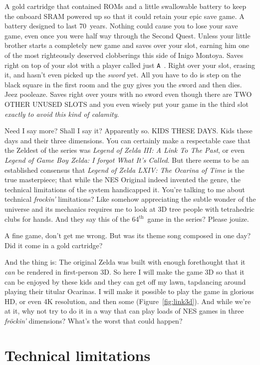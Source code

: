 \documentclass[twocolumn]{article}
\renewcommand\th{$^{\mathrm{th}}$}
\begin{document}
A gold cartridge that contained ROMs and a little swallowable battery
to keep the onboard SRAM powered up so that it could retain your epic
save game. A battery designed to last 70~years. Nothing could cause
you to lose your save game, even once you were half way through the
Second Quest. Unless your little brother starts a completely new game
and saves over your slot, earning him one of the most righteously
deserved clobberings this side of Inigo Montoya. Saves right on top of
your slot with a player called just \verb+A +. Right over your slot,
erasing it, and hasn't even picked up the {\it sword} yet. All you
have to do is step on the black square in the first room and the guy
gives you the sword and then dies. Jeez pooleaze. Saves right over
yours with no sword even though there are TWO OTHER UNUSED SLOTS and
you even wisely put your game in the third slot {\it exactly to avoid
  this kind of calamity}.

\medskip
Need I say more? Shall I say it? Apparently so. KIDS THESE DAYS. Kids
these days and their three dimensions. You can certainly make a
respectable case that the Zeldest of the series was {\it Legend of
  Zelda III: A Link To The Past}, or even {\it Legend of Game Boy
  Zelda: I forgot What It's Called}. But there seems to be an
established consensus that {\it Legend of Zelda LXIV: The Ocarina of
  Time} is the true masterpiece; that while the NES Original indeed
invented the genre, the technical limitations of the system
handicapped it. You're talking to me about technical {\it frockin'}
limitations? Like somehow appreciating the subtle wonder of the
universe and its mechanics requires me to look at 3D tree people with
tetrahedric clubs for hands. And they say this of the 64\th\ game in
the series? Please jouize.

A fine game, don't get me wrong. But was its theme song composed in
one day? Did it come in a gold cartridge?

And the thing is: The original Zelda was built with enough forethought
that it {\em can} be rendered in first-person 3D. So here I will make
the game 3D so that it can be enjoyed by these kids and they can get
off my lawn, tapdancing around playing their titular Ocarinas. I will
make it possible to play the game in glorious HD, or even 4K
resolution, and then some (Figure~\ref{fig:link3d}). And while
we're at it, why not try to do it in a way that can play loads of NES
games in three {\it fr\"ockin'} dimensions? What's the worst that
could happen?


\section{Technical limitations}
\end{document}
